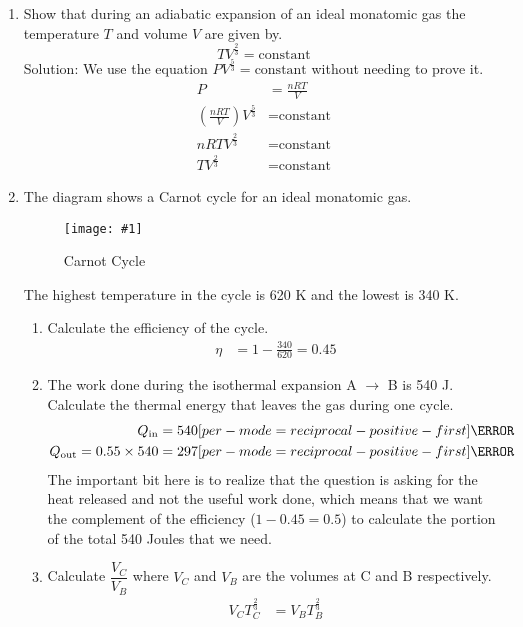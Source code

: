 \documentclass[a4paper,12pt]{article}
\let\oldsi\si
\renewcommand{\si}[1]{\oldsi[per-mode=reciprocal-positive-first]{#1}}
\newcommand{\img}[4]{\begin{center}
  \begin{figure}[H]
    \centering
    \texttt{[image: \#1]}
    \caption{#3}
    \label{fig:#4}
  \end{figure}
\end{center}}
\begin{document}
\begin{enumerate}[label=(\alph*)]
  \item Show that during an adiabatic expansion of an ideal monatomic gas the temperature $T$ and volume $V$ are given by.
        $$TV^{\frac{2}{3}} = \text{constant}$$
        Solution: We use the equation $PV^{\frac{5}{3}} = \text{constant}$ without needing to prove it.
        \begin{align*}
          P                              & = \frac{nRT}{V}   \\
          (\frac{nRT}{V})V^{\frac{5}{3}} & = \text{constant} \\
          nRTV^{\frac{2}{3}}             & = \text{constant} \\
          TV^{\frac{2}{3}}               & = \text{constant}
        \end{align*}
  \item The diagram shows a Carnot cycle for an ideal monatomic gas.
        \img{ex/4.png}{0.3}{Carnot Cycle}{ex4}
        The highest temperature in the cycle is 620 K and the lowest is 340 K.
        \begin{enumerate}[label=(\roman*)]
          \item Calculate the efficiency of the cycle.
                \begin{align*}
                  \eta & = 1 - \frac{340}{620} = 0.45
                \end{align*}
          \item The work done during the isothermal expansion A $\to$ B is 540 J. Calculate the
                thermal energy that leaves the gas during one cycle.
                \begin{align*}
                  Q_\text{in}                    & = 540\si{\joule} \\
                  Q_\text{out} = 0.55 \times 540 & = 297\si{\joule}
                \end{align*}
                The important bit here is to realize that the question is asking for the heat released and not the useful work done, which means that we want the complement of the efficiency ($1 - 0.45 = 0.5$) to calculate the portion of the total 540 Joules that we need.
          \item Calculate $\dfrac{V_C}{V_B}$ where $V_C$ and $V_B$ are the volumes at C and B respectively.
                \begin{align*}
                  V_CT_C^\frac{2}{3}                                         & = V_BT_B^\frac{2}{3}                             \\

\end{align*}
\end{enumerate}
\end{enumerate}
\end{document}
